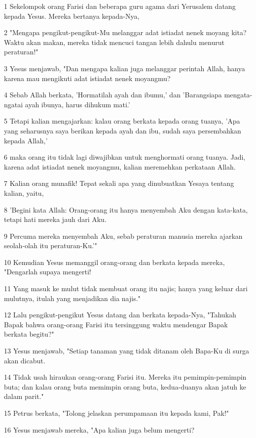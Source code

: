 \par 1 Sekelompok orang Farisi dan beberapa guru agama dari Yerusalem datang kepada Yesus. Mereka bertanya kepada-Nya,
\par 2 "Mengapa pengikut-pengikut-Mu melanggar adat istiadat nenek moyang kita? Waktu akan makan, mereka tidak mencuci tangan lebih dahulu menurut peraturan!"
\par 3 Yesus menjawab, "Dan mengapa kalian juga melanggar perintah Allah, hanya karena mau mengikuti adat istiadat nenek moyangmu?
\par 4 Sebab Allah berkata, 'Hormatilah ayah dan ibumu,' dan 'Barangsiapa mengata-ngatai ayah ibunya, harus dihukum mati.'
\par 5 Tetapi kalian mengajarkan: kalau orang berkata kepada orang tuanya, 'Apa yang seharusnya saya berikan kepada ayah dan ibu, sudah saya persembahkan kepada Allah,'
\par 6 maka orang itu tidak lagi diwajibkan untuk menghormati orang tuanya. Jadi, karena adat istiadat nenek moyangmu, kalian meremehkan perkataan Allah.
\par 7 Kalian orang munafik! Tepat sekali apa yang dinubuatkan Yesaya tentang kalian, yaitu,
\par 8 'Begini kata Allah: Orang-orang itu hanya menyembah Aku dengan kata-kata, tetapi hati mereka jauh dari Aku.
\par 9 Percuma mereka menyembah Aku, sebab peraturan manusia mereka ajarkan seolah-olah itu peraturan-Ku.'"
\par 10 Kemudian Yesus memanggil orang-orang dan berkata kepada mereka, "Dengarlah supaya mengerti!
\par 11 Yang masuk ke mulut tidak membuat orang itu najis; hanya yang keluar dari mulutnya, itulah yang menjadikan dia najis."
\par 12 Lalu pengikut-pengikut Yesus datang dan berkata kepada-Nya, "Tahukah Bapak bahwa orang-orang Farisi itu tersinggung waktu mendengar Bapak berkata begitu?"
\par 13 Yesus menjawab, "Setiap tanaman yang tidak ditanam oleh Bapa-Ku di surga akan dicabut.
\par 14 Tidak usah hiraukan orang-orang Farisi itu. Mereka itu pemimpin-pemimpin buta; dan kalau orang buta memimpin orang buta, kedua-duanya akan jatuh ke dalam parit."
\par 15 Petrus berkata, "Tolong jelaskan perumpamaan itu kepada kami, Pak!"
\par 16 Yesus menjawab mereka, "Apa kalian juga belum mengerti?
